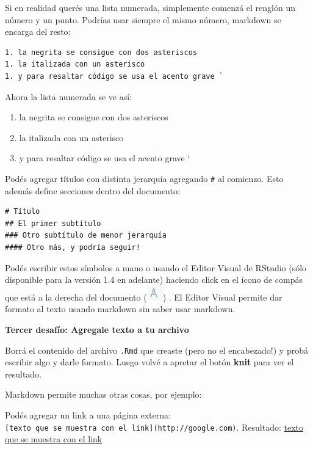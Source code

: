\documentclass[
  openany]{book}
\providecommand{\tightlist}{%
  \setlength{\itemsep}{0pt}\setlength{\parskip}{0pt}}
\begin{document}
Si en realidad querés una lista numerada, simplemente comenzá el renglón un número y un punto.
Podrías usar siempre el mismo número, markdown se encarga del resto:

\begin{verbatim}
1. la negrita se consigue con dos asteriscos
1. la italizada con un asterisco
1. y para resaltar código se usa el acento grave `
\end{verbatim}

Ahora la lista numerada se ve así:

\begin{enumerate}
\def\labelenumi{\arabic{enumi}.}
\tightlist
\item
  la negrita se consigue con dos asteriscos
\item
  la italizada con un asterisco
\item
  y para resaltar código se usa el acento grave `
\end{enumerate}

Podés agregar títulos con distinta jerarquía agregando \texttt{\#} al comienzo.
Esto además define secciones dentro del documento:

\begin{verbatim}
# Título
## El primer subtítulo
### Otro subtítulo de menor jerarquía
#### Otro más, y podría seguir!
\end{verbatim}

Podés escribir estos símbolos a mano o usando el Editor Visual de RStudio (sólo disponible para la versión 1.4 en adelante) haciendo click en el ícono de compás que está a la derecha del documento (\includegraphics{img/icono-editor-visual.png}) .
El Editor Visual permite dar formato al texto usando markdown sin saber usar markdown.

\textbf{Tercer desafío: Agregale texto a tu archivo}

Borrá el contenido del archivo \texttt{.Rmd} que creaste (pero no el encabezado!) y probá escribir algo y darle formato.
Luego volvé a apretar el botón \textbf{knit} para ver el resultado.

Markdown permite muchas otras cosas, por ejemplo:

Podés agregar un link a una página externa: \texttt{{[}texto\ que\ se\ muestra\ con\ el\ link{]}(http://google.com)}.
Resultado: \href{http://google.com}{texto que se muestra con el link}
\end{document}
